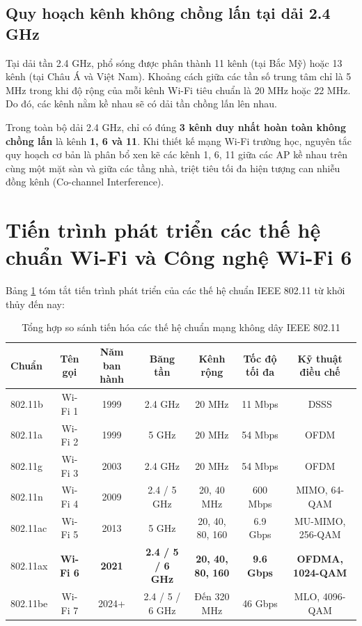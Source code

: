 \subsection{Quy hoạch kênh không chồng lấn tại dải 2.4 GHz}

Tại dải tần 2.4 GHz, phổ sóng được phân thành 11 kênh (tại Bắc Mỹ) hoặc 13 kênh (tại Châu Á và Việt Nam). Khoảng cách giữa các tần số trung tâm chỉ là 5 MHz trong khi độ rộng của mỗi kênh Wi-Fi tiêu chuẩn là 20 MHz hoặc 22 MHz. Do đó, các kênh nằm kề nhau sẽ có dải tần chồng lấn lên nhau.

Trong toàn bộ dải 2.4 GHz, chỉ có đúng \textbf{3 kênh duy nhất hoàn toàn không chồng lấn} là kênh \textbf{1, 6 và 11}. Khi thiết kế mạng Wi-Fi trường học, nguyên tắc quy hoạch cơ bản là phân bổ xen kẽ các kênh 1, 6, 11 giữa các AP kề nhau trên cùng một mặt sàn và giữa các tầng nhà, triệt tiêu tối đa hiện tượng can nhiễu đồng kênh (Co-channel Interference).

\section{Tiến trình phát triển các thế hệ chuẩn Wi-Fi và Công nghệ Wi-Fi 6}

Bảng \ref{tab:wifi_evolution} tóm tắt tiến trình phát triển của các thế hệ chuẩn IEEE 802.11 từ khởi thủy đến nay:

\begin{table}[htbp]
\centering
\caption{Tổng hợp so sánh tiến hóa các thế hệ chuẩn mạng không dây IEEE 802.11}
\label{tab:wifi_evolution}
\small
\begin{tabular}{lcccccc}
\toprule
\textbf{Chuẩn} & \textbf{Tên gọi} & \textbf{Năm ban hành} & \textbf{Băng tần} & \textbf{Kênh rộng} & \textbf{Tốc độ tối đa} & \textbf{Kỹ thuật điều chế} \\
\midrule
802.11b & Wi-Fi 1 & 1999 & 2.4 GHz & 20 MHz & 11 Mbps & DSSS \\
802.11a & Wi-Fi 2 & 1999 & 5 GHz & 20 MHz & 54 Mbps & OFDM \\
802.11g & Wi-Fi 3 & 2003 & 2.4 GHz & 20 MHz & 54 Mbps & OFDM \\
802.11n & Wi-Fi 4 & 2009 & 2.4 / 5 GHz & 20, 40 MHz & 600 Mbps & MIMO, 64-QAM \\
802.11ac & Wi-Fi 5 & 2013 & 5 GHz & 20, 40, 80, 160 & 6.9 Gbps & MU-MIMO, 256-QAM \\
802.11ax & \textbf{Wi-Fi 6} & \textbf{2021} & \textbf{2.4 / 5 / 6 GHz} & \textbf{20, 40, 80, 160} & \textbf{9.6 Gbps} & \textbf{OFDMA, 1024-QAM} \\
802.11be & Wi-Fi 7 & 2024+ & 2.4 / 5 / 6 GHz & Đến 320 MHz & 46 Gbps & MLO, 4096-QAM \\
\bottomrule
\end{tabular}
\end{table}

